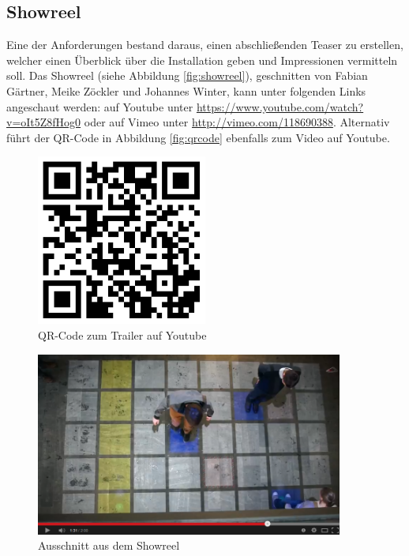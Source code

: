 \subsection{Showreel}

Eine der Anforderungen bestand daraus, einen abschließenden Teaser zu erstellen, welcher einen Überblick über die Installation geben und Impressionen vermitteln soll. Das Showreel (siehe Abbildung \autoref{fig:showreel}), geschnitten von Fabian Gärtner, Meike Zöckler und Johannes Winter, kann unter folgenden Links angeschaut werden: auf Youtube unter \url{https://www.youtube.com/watch?v=oIt5Z8fHog0} oder auf Vimeo unter \url{http://vimeo.com/118690388}. Alternativ führt der QR-Code in Abbildung \autoref{fig:qrcode} ebenfalls zum Video auf Youtube.

\begin{figure}[htbp]
	\centering
		\includegraphics[width=0.5\textwidth]{images/qrcode.png}
	\caption{QR-Code zum Trailer auf Youtube}
	\label{fig:qrcode}
\end{figure}

\begin{figure}[htbp]
	\centering
		\includegraphics[width=0.9\textwidth]{images/showreel.png}
	\caption{Ausschnitt aus dem Showreel}
	\label{fig:showreel}
\end{figure}